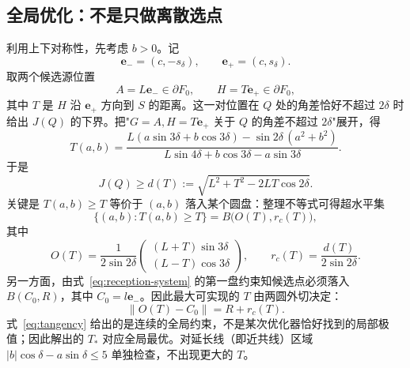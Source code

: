 \documentclass[12pt,a4paper]{ctexart}
\begin{document}
\subsection{全局优化：不是只做离散选点}
\label{sec:q2-global}
利用上下对称性，先考虑 $b>0$。记
\[
 \bm e_-=(c,-s_\delta),\qquad \bm e_+=(c,s_\delta).
\]
取两个候选源位置
\[
 A=L\bm e_- \in\partial F_0,\qquad H=T\bm e_+ \in\partial F_0,
\]
其中 $T$ 是 $H$ 沿 $\bm e_+$ 方向到 $S$ 的距离。这一对位置在 $Q$ 处的角差恰好不超过 $2\delta$ 时给出 $J(Q)$ 的下界。把"$G=A,H=T\bm e_+$ 关于 $Q$ 的角差不超过 $2\delta$"展开，得
\begin{equation}
 T(a,b)=\frac{L(a\sin3\delta+b\cos3\delta)-\sin2\delta\,(a^2+b^2)}
               {L\sin4\delta+b\cos3\delta-a\sin3\delta}.
 \label{eq:T-rational}
\end{equation}
于是
\begin{equation}
 J(Q)\ge d(T):=\sqrt{L^2+T^2-2LT\cos2\delta}.
 \label{eq:lower-bound}
\end{equation}
关键是 $T(a,b)\ge T$ 等价于 $(a,b)$ 落入某个圆盘：整理不等式可得超水平集
\begin{equation}
 \bigl\{(a,b):T(a,b)\ge T\bigr\}=B\bigl(O(T),r_c(T)\bigr),
 \label{eq:superlevel}
\end{equation}
其中
\[
 O(T)=\frac{1}{2\sin2\delta}
       \begin{pmatrix}(L+T)\sin3\delta\\ (L-T)\cos3\delta\end{pmatrix},
 \qquad
 r_c(T)=\frac{d(T)}{2\sin2\delta}.
\]
另一方面，由式~\eqref{eq:reception-system} 的第一盘约束知候选点必须落入 $B(C_0,R)$，其中 $C_0=l\bm e_-$。因此最大可实现的 $T$ 由两圆外切决定：
\begin{equation}
 \boxed{\;\|O(T)-C_0\|=R+r_c(T).\;}
 \label{eq:tangency}
\end{equation}
式~\eqref{eq:tangency} 给出的是连续的全局约束，不是某次优化器恰好找到的局部极值；因此解出的 $T_*$ 对应全局最优。对延长线（即近共线）区域 $|b|\cos\delta-a\sin\delta\le5$ 单独检查，不出现更大的 $T$。
\end{document}
